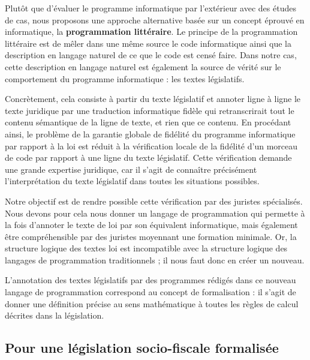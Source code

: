 Plutôt que d'évaluer le programme informatique par l'extérieur avec des études de cas, nous proposons une approche alternative basée sur un concept éprouvé en informatique, la \textbf{programmation littéraire}. Le principe de la programmation littéraire est de mêler dans une même source le code informatique ainsi que la description en langage naturel de ce que le code est censé faire. Dans notre cas, cette description en langage naturel est également la source de vérité sur le comportement du programme informatique : les textes législatifs.

Concrètement, cela consiste à partir du texte législatif et annoter ligne à ligne le texte juridique par une traduction informatique fidèle qui retranscrirait tout le contenu sémantique de la ligne de texte, et rien que ce contenu. En procédant ainsi, le problème de la garantie globale de fidélité du programme informatique par rapport à la loi est réduit à la vérification locale de la fidélité d'un morceau de code par rapport à une ligne du texte législatif. Cette vérification demande une grande expertise juridique, car il s'agit de connaître précisément l'interprétation du texte législatif dans toutes les situations possibles.

Notre objectif est de rendre possible cette vérification par des juristes spécialisés. Nous devons pour cela nous donner un langage de programmation qui permette à la fois d'annoter le texte de loi par son équivalent informatique, mais également être compréhensible par des juristes moyennant une formation minimale. Or, la structure logique des textes loi est incompatible avec la structure logique des langages de programmation traditionnels ; il nous faut donc en créer un nouveau.

L'annotation des textes législatifs par des programmes rédigés dans ce nouveau langage de programmation correspond au concept de formalisation : il s'agit de donner une définition précise au sens mathématique à toutes les règles de calcul décrites dans la législation.

\subsection{Pour une législation socio-fiscale formalisée}

